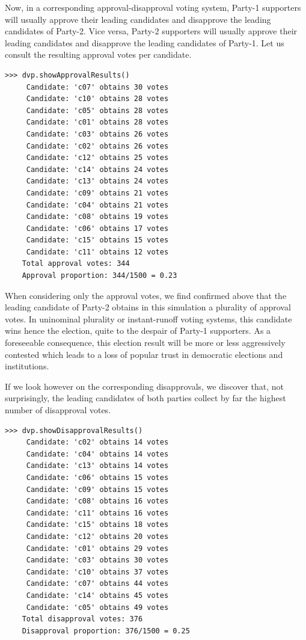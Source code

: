 Now, in a corresponding approval-disapproval voting system, Party-1 supporters will usually approve their leading candidates and disapprove the leading candidates of Party-2. Vice versa, Party-2 supporters will usually approve their leading candidates and disapprove the leading candidates of Party-1. Let us consult the resulting approval votes per candidate.
\begin{lstlisting}
>>> dvp.showApprovalResults()
     Candidate: 'c07' obtains 30 votes
     Candidate: 'c10' obtains 28 votes
     Candidate: 'c05' obtains 28 votes
     Candidate: 'c01' obtains 28 votes
     Candidate: 'c03' obtains 26 votes
     Candidate: 'c02' obtains 26 votes
     Candidate: 'c12' obtains 25 votes
     Candidate: 'c14' obtains 24 votes
     Candidate: 'c13' obtains 24 votes
     Candidate: 'c09' obtains 21 votes
     Candidate: 'c04' obtains 21 votes
     Candidate: 'c08' obtains 19 votes
     Candidate: 'c06' obtains 17 votes
     Candidate: 'c15' obtains 15 votes
     Candidate: 'c11' obtains 12 votes
    Total approval votes: 344
    Approval proportion: 344/1500 = 0.23
\end{lstlisting}

When considering only the approval votes, we find confirmed above that the leading candidate of Party-2 obtains in this simulation a plurality of approval votes. In uninominal plurality or instant-runoff voting systems, this candidate wins hence the election, quite to the despair of Party-1 supporters. As a foreseeable consequence, this election result will be more or less aggressively contested which leads to a loss of popular trust in democratic elections and institutions.

If we look however on the corresponding disapprovals, we discover that, not surprisingly, the leading candidates of both parties collect by far the highest number of disapproval votes. 
\begin{lstlisting}
>>> dvp.showDisapprovalResults()
     Candidate: 'c02' obtains 14 votes
     Candidate: 'c04' obtains 14 votes
     Candidate: 'c13' obtains 14 votes
     Candidate: 'c06' obtains 15 votes
     Candidate: 'c09' obtains 15 votes
     Candidate: 'c08' obtains 16 votes
     Candidate: 'c11' obtains 16 votes
     Candidate: 'c15' obtains 18 votes
     Candidate: 'c12' obtains 20 votes
     Candidate: 'c01' obtains 29 votes
     Candidate: 'c03' obtains 30 votes
     Candidate: 'c10' obtains 37 votes
     Candidate: 'c07' obtains 44 votes
     Candidate: 'c14' obtains 45 votes
     Candidate: 'c05' obtains 49 votes
    Total disapproval votes: 376
    Disapproval proportion: 376/1500 = 0.25
\end{lstlisting}

